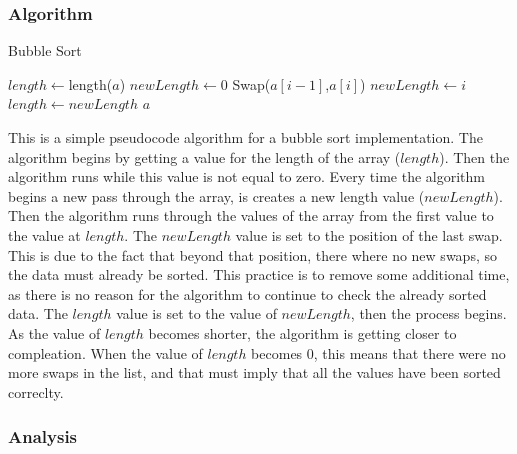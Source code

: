 \documentclass{subfile}
\begin{document}
\begin{multicols}{2}
     \subsubsection{Algorithm}
     \label{ssub:algorithm}
     \begin{algorithm}[H]
       \caption{Bubble Sort}
       \label{alg:bubble_sort}
       \begin{algorithmic}
           \State $length \gets $length($a$)
             \State $newLength \gets 0$
                 \State Swap($a[i-1]$,$a[i]$)
                 \State $newLength \gets i$
               \EndIf
             \EndFor
             \State $length\gets newLength$
           \EndWhile
           \State \Return $a$
         \EndFunction
       \end{algorithmic}
     \end{algorithm}

     This is a simple pseudocode algorithm for a bubble sort implementation.
     The algorithm begins by getting a value for the length of the array
     ($length$). Then the algorithm runs while this value is not equal to zero.
     Every time the algorithm begins a new pass through the array, is creates a
     new length value ($newLength$). Then the algorithm runs through the values
     of the array from the first value to the value at $length$. The
     $newLength$ value is set to the position of the last swap. This is due to
     the fact that beyond that position, there where no new swaps, so the data
     must already be sorted. This practice is to remove some additional time,
     as there is no reason for the algorithm to continue to check the already
     sorted data. The $length$ value is set to the value of $newLength$, then
     the process begins. As the value of $length$ becomes shorter, the
     algorithm is getting closer to compleation. When the value of $length$
     becomes $0$, this means that there were no more swaps in the list, and
     that must imply that all the values have been sorted correclty.

     \subsubsection{Analysis}
     \label{ssub:analysis}
     

\end{multicols}
\end{document}
